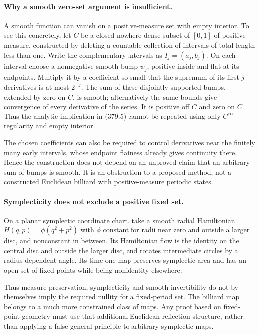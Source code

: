 \documentclass[11pt]{article}
\begin{document}
\paragraph{Why a smooth zero-set argument is insufficient.}
A smooth function can vanish on a positive-measure set with empty
interior. To see this concretely, let $C$ be a closed nowhere-dense
subset of $[0,1]$ of positive measure, constructed by deleting a
countable collection of intervals of total length less than one.
Write the complementary intervals as $I_j=(a_j,b_j)$. On each interval
choose a nonnegative smooth bump $\psi_j$, positive inside and flat
at its endpoints. Multiply it by a coefficient so small that the
supremum of its first $j$ derivatives is at most $2^{-j}$.
The sum of these disjointly supported bumps, extended by zero on
$C$, is smooth; alternatively the same bounds give convergence of
every derivative of the series. It is positive off $C$ and zero
on $C$. Thus the analytic implication in (379.5) cannot be repeated
using only $C^\infty$ regularity and empty interior.

The chosen coefficients can also be required to control derivatives
near the finitely many early intervals, whose endpoint flatness
already gives continuity there. Hence the construction does not
depend on an unproved claim that an arbitrary sum of bumps is smooth.
It is an obstruction to a proposed method, not a constructed
Euclidean billiard with positive-measure periodic states.

\paragraph{Symplecticity does not exclude a positive fixed set.}
On a planar symplectic coordinate chart, take a smooth radial
Hamiltonian $H(q,p)=\phi(q^2+p^2)$ with $\phi$ constant for radii
near zero and outside a larger disc, and nonconstant in between.
Its Hamiltonian flow is the identity on the central disc and outside
the larger disc, and rotates intermediate circles by a radius-dependent
angle. Its time-one map preserves symplectic area and has an open
set of fixed points while being nonidentity elsewhere.

Thus measure preservation, symplecticity and smooth invertibility
do not by themselves imply the required nullity for a fixed-period
set. The billiard map belongs to a much more constrained class of
maps. Any proof based on fixed-point geometry must use that additional
Euclidean reflection structure, rather than applying a false general
principle to arbitrary symplectic maps.
\end{document}
